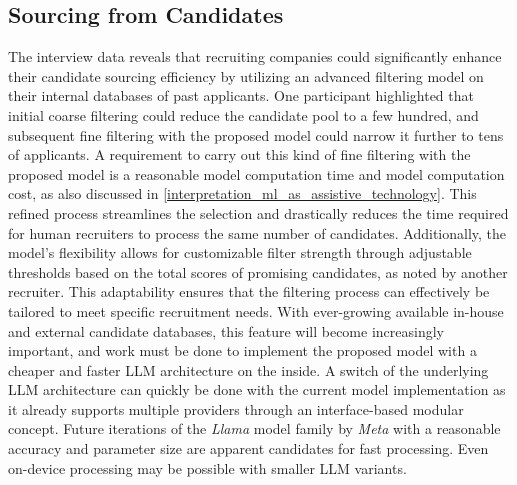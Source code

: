 \documentclass[draft,final]{thesisclass} %
\begin{document}
\subsection{Sourcing from Candidates}
The interview data reveals that recruiting companies could significantly enhance their candidate sourcing efficiency by utilizing an advanced filtering model on their internal databases of past applicants. One participant highlighted that initial coarse filtering could reduce the candidate pool to a few hundred, and subsequent fine filtering with the proposed model could narrow it further to tens of applicants. A requirement to carry out this kind of fine filtering with the proposed model is a reasonable model computation time and model computation cost, as also discussed in \ref{interpretation_ml_as_assistive_technology}. This refined process streamlines the selection and drastically reduces the time required for human recruiters to process the same number of candidates. Additionally, the model's flexibility allows for customizable filter strength through adjustable thresholds based on the total scores of promising candidates, as noted by another recruiter. This adaptability ensures that the filtering process can effectively be tailored to meet specific recruitment needs. With ever-growing available in-house and external candidate databases, this feature will become increasingly important, and work must be done to implement the proposed model with a cheaper and faster \gls{LLM} architecture on the inside. A switch of the underlying \gls{LLM} architecture can quickly be done with the current model implementation as it already supports multiple providers through an interface-based modular concept. Future iterations of the \textit{Llama} model family by \textit{Meta} with a reasonable accuracy and parameter size are apparent candidates for fast processing. Even on-device processing may be possible with smaller \gls{LLM} variants.
\end{document}
